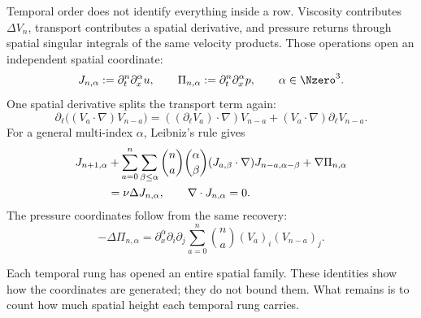 Temporal order does not identify everything inside a row.
Viscosity contributes \(\Delta V_n\), transport contributes a spatial derivative, and pressure returns through spatial singular integrals of the same velocity products.
Those operations open an independent spatial coordinate:
\begin{equation}\label{eq:BodyMixedJetDefinition}
  J_{n,\alpha}:=\partial_t^n\partial_x^\alpha u,
  \qquad
  \Pi_{n,\alpha}:=\partial_t^n\partial_x^\alpha p,
  \qquad
  \alpha\in\Nzero^3.
\end{equation}
One spatial derivative splits the transport term again:
\[
  \partial_\ell\bigl((V_a\cdot\nabla)V_{n-a}\bigr)
  =((\partial_\ell V_a)\cdot\nabla)V_{n-a}
  +(V_a\cdot\nabla)\partial_\ell V_{n-a}.
\]
For a general multi-index \(\alpha\), Leibniz's rule gives
\begin{align}
  J_{n+1,\alpha}
  &+
  \sum_{a=0}^{n}
  \sum_{\beta\leq\alpha}
  \binom{n}{a}\binom{\alpha}{\beta}
  (J_{a,\beta}\cdot\nabla)
  J_{n-a,\alpha-\beta}
  +\nabla\Pi_{n,\alpha}
  \notag\\
  &=
  \nu\Delta J_{n,\alpha},
  \qquad
  \nabla\cdot J_{n,\alpha}=0.
  \label{eq:BodyMixedJetRecurrence}
\end{align}
The pressure coordinates follow from the same recovery:
\begin{equation}\label{eq:BodyMixedPressureRecurrence}
  -\Delta\Pi_{n,\alpha}
  =
  \partial_x^\alpha\partial_i\partial_j
  \sum_{a=0}^{n}\binom{n}{a}
  (V_a)_i(V_{n-a})_j.
\end{equation}

Each temporal rung has opened an entire spatial family.
These identities show how the coordinates are generated; they do not bound them.
What remains is to count how much spatial height each temporal rung carries.
